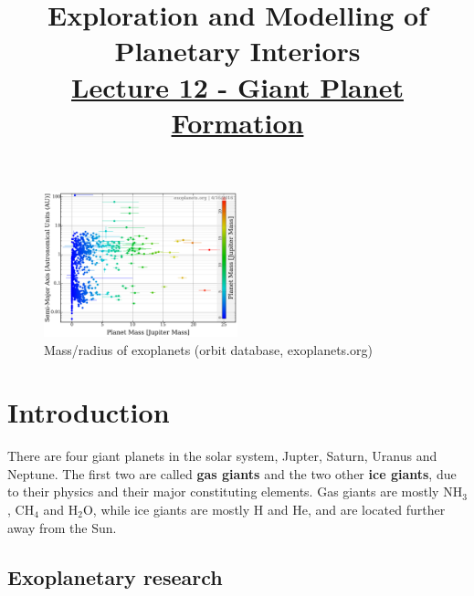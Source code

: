 \documentclass[12pt]{article} %
\title{\large{\vspace{-5ex}\textbf{Exploration and Modelling of Planetary Interiors}}\newline\\{\textbf{\underline{Lecture 12 - Giant Planet Formation}}}\vspace{-7ex}}
\author{}
\date{} %
\begin{document}
\begingroup
\let\center\flushleft
\let\endcenter\endflushleft
\maketitle
\endgroup

\begingroup
\let\cleardoublepage\relax
\let\clearpage\relax
\tableofcontents
\endgroup

\begin{figure}
\begin{center}
 \includegraphics[width=0.5\textwidth,keepaspectratio=true]{./images/exoplanets}
 \caption{Mass/radius of exoplanets (orbit database, exoplanets.org)}
 \label{exoplanets}
\end{center}
\end{figure}


\section{Introduction}\vspace{-2ex}\titlerule[1pt]\bigskip

There are four giant planets in the solar system, Jupter, Saturn, Uranus and Neptune. The first two are called \textbf{gas giants} and the two other \textbf{ice giants}, due to their physics and their major constituting elements. Gas giants are mostly NH$_3$, CH$_4$ and H$_2$O, while ice giants are mostly H and He, and are located further away from the Sun.

\subsection{Exoplanetary research}\vspace{-1ex}\bigskip
\end{document}
